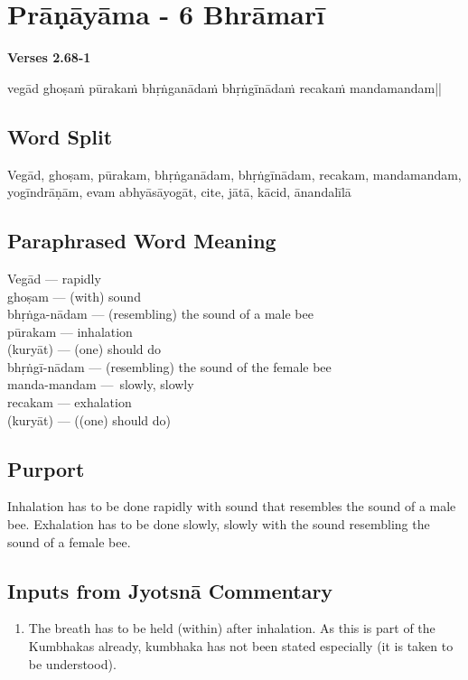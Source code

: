 \section*{Prāṇāyāma - 6 Bhrāmarī}

\noindent \textbf{Verses 2.68-1}

vegād ghoṣaṁ pūrakaṁ bhṛṅganādaṁ  bhṛṅgīnādaṁ recakaṁ manda\-mandam|| 

\subsection*{Word Split}


Vegād, ghoṣam, pūrakam, bhṛṅganādam, bhṛṅgīnādam, recakam, mandamandam, yogīndrāṇām, evam abhyāsāyogāt, cite, jātā, kācid, ānandalīlā

\subsection*{Paraphrased Word Meaning}


\begin{multicols}{2}
Vegād --- rapidly\\
ghoṣam --- (with) sound \\
bhṛṅga-nādam --- (resembling) the sound of a male bee\\
pūrakam --- inhalation \\
(kuryāt) --- (one) should do \\
bhṛṅgī-nādam --- (resembling) the sound of the female bee \\
manda-mandam --- slowly, slowly \\
recakam --- exhalation \\
(kuryāt) --- ((one) should do)
\end{multicols}

\subsection*{Purport}


Inhalation has to be done rapidly with sound that resembles the sound of a male bee. Exhalation has to be done slowly, slowly with the sound resembling the sound of a female bee.

\subsection*{Inputs from Jyotsnā Commentary}


\begin{enumerate}
\item The breath has to be held (within) after inhalation. As this is part of the Kumbhakas already, kumbhaka has not been stated especially (it is taken to be understood). 
\end{enumerate}

